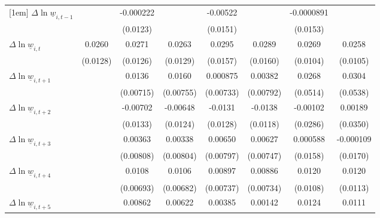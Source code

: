 {\begin{tabular}{l*{7}{c}}
[1em]
$\Delta \ln \underline{w}_{i,t-1}$&                  &-0.000222         &                  & -0.00522         &                  &-0.0000891         &                  \\
          &                  & (0.0123)         &                  & (0.0151)         &                  & (0.0153)         &                  \\
[1em]
$\Delta \ln \underline{w}_{i,t}$&   0.0260\sym{**} &   0.0271\sym{**} &   0.0263\sym{**} &   0.0295\sym{*}  &   0.0289\sym{*}  &   0.0269\sym{**} &   0.0258\sym{**} \\
          & (0.0128)         & (0.0126)         & (0.0129)         & (0.0157)         & (0.0160)         & (0.0104)         & (0.0105)         \\
[1em]
$\Delta \ln \underline{w}_{i,t+1}$&                  &   0.0136\sym{*}  &   0.0160\sym{**} & 0.000875         &  0.00382         &   0.0268         &   0.0304         \\
          &                  &(0.00715)         &(0.00755)         &(0.00733)         &(0.00792)         & (0.0514)         & (0.0538)         \\
[1em]
$\Delta \ln \underline{w}_{i,t+2}$&                  & -0.00702         & -0.00648         &  -0.0131         &  -0.0138         & -0.00102         &  0.00189         \\
          &                  & (0.0133)         & (0.0124)         & (0.0128)         & (0.0118)         & (0.0286)         & (0.0350)         \\
[1em]
$\Delta \ln \underline{w}_{i,t+3}$&                  &  0.00363         &  0.00338         &  0.00650         &  0.00627         & 0.000588         &-0.000109         \\
          &                  &(0.00808)         &(0.00804)         &(0.00797)         &(0.00747)         & (0.0158)         & (0.0170)         \\
[1em]
$\Delta \ln \underline{w}_{i,t+4}$&                  &   0.0108         &   0.0106         &  0.00897         &  0.00886         &   0.0120         &   0.0120         \\
          &                  &(0.00693)         &(0.00682)         &(0.00737)         &(0.00734)         & (0.0108)         & (0.0113)         \\
[1em]
$\Delta \ln \underline{w}_{i,t+5}$&                  &  0.00862         &  0.00622         &  0.00385         &  0.00142         &   0.0124         &   0.0111         \\

\end{tabular}}
